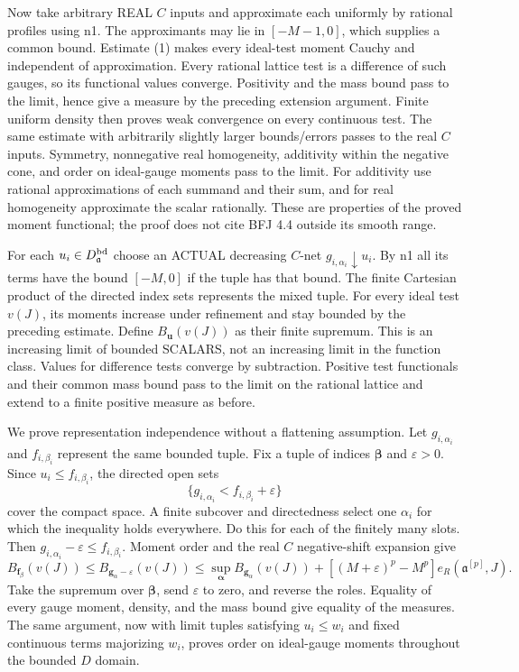 \documentclass[
  11pt,
]{article}
\begin{document}
Now take arbitrary REAL \(C\) inputs and approximate each uniformly by
rational profiles using n1. The approximants may lie in \([-M-1,0]\),
which supplies a common bound. Estimate (1) makes every ideal-test
moment Cauchy and independent of approximation. Every rational lattice
test is a difference of such gauges, so its functional values converge.
Positivity and the mass bound pass to the limit, hence give a measure by
the preceding extension argument. Finite uniform density then proves
weak convergence on every continuous test. The same estimate with
arbitrarily slightly larger bounds/errors passes to the real \(C\)
inputs. Symmetry, nonnegative real homogeneity, additivity within the
negative cone, and order on ideal-gauge moments pass to the limit. For
additivity use rational approximations of each summand and their sum,
and for real homogeneity approximate the scalar rationally. These are
properties of the proved moment functional; the proof does not cite BFJ
4.4 outside its smooth range.

For each \(u_i\in D^{\rm bd}_{\mathfrak a}\) choose an ACTUAL decreasing
\(C\)-net \(g_{i,\alpha_i}\downarrow u_i\). By n1 all its terms have the
bound \([-M,0]\) if the tuple has that bound. The finite Cartesian
product of the directed index sets represents the mixed tuple. For every
ideal test \(v(J)\), its moments increase under refinement and stay
bounded by the preceding estimate. Define \(B_{\boldsymbol u}(v(J))\) as
their finite supremum. This is an increasing limit of bounded SCALARS,
not an increasing limit in the function class. Values for difference
tests converge by subtraction. Positive test functionals and their
common mass bound pass to the limit on the rational lattice and extend
to a finite positive measure as before.

We prove representation independence without a flattening assumption.
Let \(g_{i,\alpha_i}\) and \(f_{i,\beta_i}\) represent the same bounded
tuple. Fix a tuple of indices \(\boldsymbol\beta\) and
\(\varepsilon>0\). Since \(u_i\le f_{i,\beta_i}\), the directed open
sets \[\{g_{i,\alpha_i}<f_{i,\beta_i}+\varepsilon\}\] cover the compact
space. A finite subcover and directedness select one \(\alpha_i\) for
which the inequality holds everywhere. Do this for each of the finitely
many slots. Then \(g_{i,\alpha_i}-\varepsilon\le f_{i,\beta_i}\). Moment
order and the real \(C\) negative-shift expansion give
\[B_{\boldsymbol f_{\beta}}(v(J))\le B_{\boldsymbol g_{\alpha}-\varepsilon}(v(J))\le \sup_{\boldsymbol\alpha}B_{\boldsymbol g_{\alpha}}(v(J))+[(M+\varepsilon)^p-M^p]e_R(\mathfrak a^{[p]},J).\]
Take the supremum over \(\boldsymbol\beta\), send \(\varepsilon\) to
zero, and reverse the roles. Equality of every gauge moment, density,
and the mass bound give equality of the measures. The same argument, now
with limit tuples satisfying \(u_i\le w_i\) and fixed continuous terms
majorizing \(w_i\), proves order on ideal-gauge moments throughout the
bounded \(D\) domain.
\end{document}
